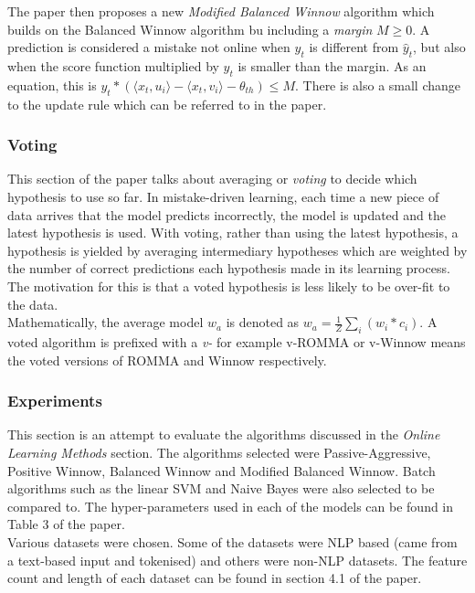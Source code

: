 \documentclass{article}
\begin{document}
The paper then proposes a new \emph{Modified Balanced Winnow} algorithm which builds on the Balanced Winnow algorithm bu including a \emph{margin} \(M \geq 0\). A prediction is considered 
a mistake not online when \(y_{t}\) is different from \(\hat{y}_{t}\), but also when the score function multiplied by \(y_{t}\) is smaller
than the margin. As an equation, this is \(y_{t}*(\langle x_{t}, u_{i} \rangle - \langle x_{t}, v_{i} \rangle - \theta_{th}) \leq M\).
There is also a small change to the update rule which can be referred to in the paper.

\newpage
\subsubsection*{Voting}

This section of the paper talks about averaging or \emph{voting} to decide which hypothesis to use so far. 
In mistake-driven learning, each time a new piece of data arrives that the model predicts incorrectly, the model is updated and the latest
hypothesis is used. With voting, rather than using the latest hypothesis, a hypothesis is yielded by averaging intermediary 
hypotheses which are weighted by the number of correct predictions each hypothesis made in its learning process. The motivation for this is that
a voted hypothesis is less likely to be over-fit to the data.\\

Mathematically, the average model \(w_{a}\) is denoted as \(w_{a} = \frac{1}{Z}\sum_{i}(w_{i}*c_{i})\). A voted algorithm is prefixed with 
a \emph{v-} for example v-ROMMA or v-Winnow means the voted versions of ROMMA and Winnow respectively.

\subsubsection*{Experiments}

This section is an attempt to evaluate the algorithms discussed in the \emph{Online Learning Methods} section. The algorithms
selected were Passive-Aggressive, Positive Winnow, Balanced Winnow and Modified Balanced Winnow. Batch algorithms such as the linear SVM
and Naive Bayes were also selected to be compared to. The hyper-parameters used in each of the models can be found in Table 3
of the paper.\\

Various datasets were chosen. Some of the datasets were NLP based (came from a text-based input and tokenised) and others were non-NLP datasets. 
The feature count and length of each dataset can be found in section 4.1 of the paper.\\
\end{document}
